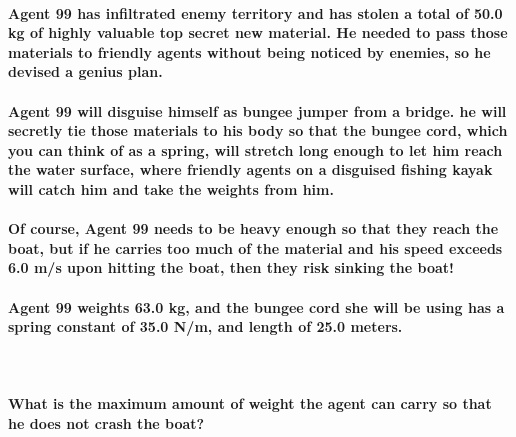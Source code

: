 \paragraph{Agent 99 has infiltrated enemy territory and has stolen a total of 50.0 kg of highly valuable top secret new material. He needed to pass those materials to friendly agents without being noticed by enemies, so he devised a genius plan.\newline}
\paragraph{Agent 99 will disguise himself as bungee jumper from a bridge. he will secretly tie those materials to his body so that the bungee cord, which you can think of as a spring, will stretch long enough to let him reach the water surface, where friendly agents on a disguised fishing kayak will catch him and take the weights from him.\newline}
\paragraph{Of course, Agent 99 needs to be heavy enough so that they reach the boat, but if he carries too much of the material and his speed exceeds 6.0 m/s upon hitting the boat, then they risk sinking the boat!\newline}
\paragraph{Agent 99 weights 63.0 kg, and the bungee cord she will be using has a spring constant of 35.0 N/m, and length of 25.0 meters.\newline}
 

\paragraph{What is the maximum amount of weight the agent can carry so that he does not crash the boat?\newline}